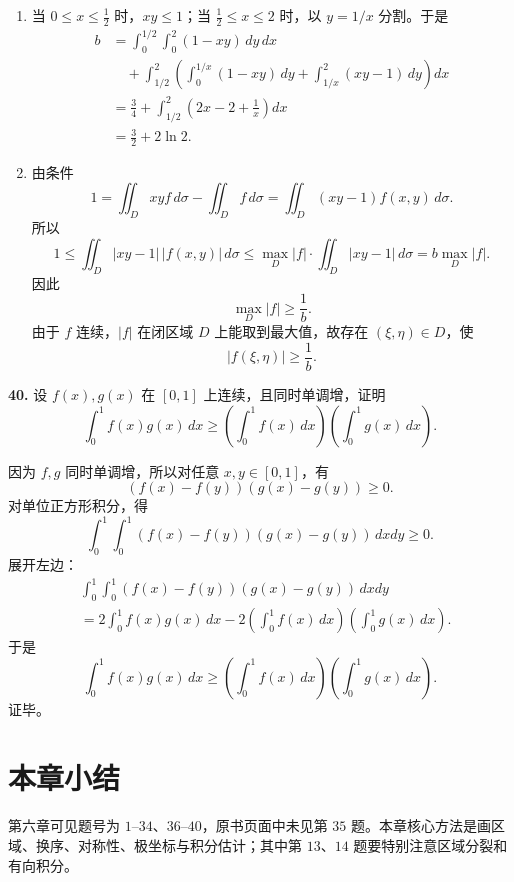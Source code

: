 \begin{solutionblock}
\begin{enumerate}
\item 当 \(0\le x\le\frac12\) 时，\(xy\le1\)；当 \(\frac12\le x\le2\) 时，以 \(y=1/x\) 分割。于是
\[
\begin{aligned}
b&=\int_0^{1/2}\int_0^2(1-xy)\,dy\,dx\\
&\quad+\int_{1/2}^2\left(\int_0^{1/x}(1-xy)\,dy+\int_{1/x}^{2}(xy-1)\,dy\right)dx\\
&=\frac34+\int_{1/2}^2\left(2x-2+\frac1x\right)dx\\
&=\boxed{\frac32+2\ln2}.
\end{aligned}
\]
\item 由条件
\[
1=\iint_Dxyf\,d\sigma-\iint_Df\,d\sigma
=\iint_D(xy-1)f(x,y)\,d\sigma.
\]
所以
\[
1\le \iint_D|xy-1|\,|f(x,y)|\,d\sigma
\le \max_D|f|\cdot \iint_D|xy-1|\,d\sigma
=b\max_D|f|.
\]
因此
\[
\max_D|f|\ge\frac1b.
\]
由于 \(f\) 连续，\(|f|\) 在闭区域 \(D\) 上能取到最大值，故存在 \((\xi,\eta)\in D\)，使
\[
|f(\xi,\eta)|\ge\frac1b.
\]
\end{enumerate}
\end{solutionblock}

\begin{problemblock}
\textbf{40.} 设 \(f(x),g(x)\) 在 \([0,1]\) 上连续，且同时单调增，证明
\[
\int_0^1f(x)g(x)\,dx\ge
\left(\int_0^1f(x)\,dx\right)
\left(\int_0^1g(x)\,dx\right).
\]
\end{problemblock}

\begin{solutionblock}
因为 \(f,g\) 同时单调增，所以对任意 \(x,y\in[0,1]\)，有
\[
(f(x)-f(y))(g(x)-g(y))\ge0.
\]
对单位正方形积分，得
\[
\int_0^1\int_0^1(f(x)-f(y))(g(x)-g(y))\,dxdy\ge0.
\]
展开左边：
\[
\begin{aligned}
&\int_0^1\int_0^1(f(x)-f(y))(g(x)-g(y))\,dxdy\\
&=2\int_0^1f(x)g(x)\,dx
-2\left(\int_0^1f(x)\,dx\right)\left(\int_0^1g(x)\,dx\right).
\end{aligned}
\]
于是
\[
\int_0^1f(x)g(x)\,dx\ge
\left(\int_0^1f(x)\,dx\right)
\left(\int_0^1g(x)\,dx\right).
\]
证毕。
\end{solutionblock}

\section{本章小结}
第六章可见题号为 \(1\)--\(34\)、\(36\)--\(40\)，原书页面中未见第 \(35\) 题。本章核心方法是画区域、换序、对称性、极坐标与积分估计；其中第 \(13\)、\(14\) 题要特别注意区域分裂和有向积分。
